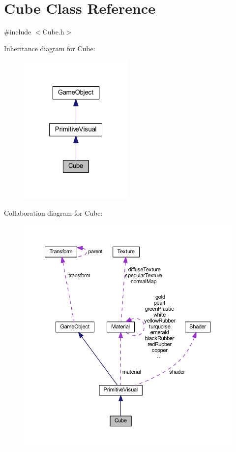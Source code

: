 \hypertarget{class_cube}{}\section{Cube Class Reference}
\label{class_cube}


{\ttfamily \#include $<$Cube.\+h$>$}



Inheritance diagram for Cube\+:
\nopagebreak
\begin{figure}[H]
\begin{center}
\leavevmode
\includegraphics[width=160pt]{class_cube__inherit__graph}
\end{center}
\end{figure}


Collaboration diagram for Cube\+:
\nopagebreak
\begin{figure}[H]
\begin{center}
\leavevmode
\includegraphics[width=350pt]{class_cube__coll__graph}
\end{center}
\end{figure}
